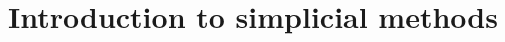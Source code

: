 \documentclass{ximera}
\title{Introduction to simplicial methods}
\begin{document}
\begin{abstract}

\end{abstract}
\maketitle

\end{document}

